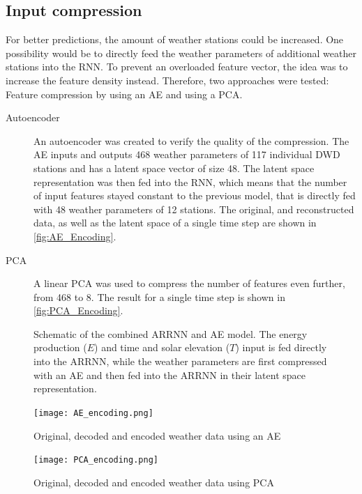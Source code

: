 \documentclass[11pt,table]{article}
\begin{document}
\subsection{Input compression}
For better predictions, the amount of weather stations could be increased. One possibility would be to directly feed the weather parameters of additional weather stations into the \ac{RNN}. To prevent an overloaded feature vector, the idea was to increase the feature density instead. Therefore, two approaches were tested: Feature compression by using an \ac{AE} and using a \ac{PCA}.

\begin{description}
\item[Autoencoder] An autoencoder was created to verify the quality of the compression. The \ac{AE} inputs and outputs 468 weather parameters of 117 individual \ac{DWD} stations and has a latent space vector of size 48. The latent space representation was then fed into the \ac{RNN}, which means that the number of input features stayed constant to the previous model, that is directly fed with 48 weather parameters of 12 stations. The original, and reconstructed data, as well as the latent space of a single time step are shown in \autoref{fig:AE_Encoding}.
\item[PCA] A linear \ac{PCA} was used to compress the number of features even further, from 468 to 8. The result for a single time step is shown in \autoref{fig:PCA_Encoding}.
\end{description}

\begin{figure}[!htb]
    \centering
    
    \caption{Schematic of the combined \ac{ARRNN} and \ac{AE} model. The energy production ($E$) and time and solar elevation ($T$) input is fed directly into the \ac{ARRNN}, while the weather parameters are first compressed with an \ac{AE} and then fed into the \ac{ARRNN} in their latent space representation.}
    \label{fig:rnn_with_ae}
\end{figure}

\begin{figure}[!htb]
	\centering
	\texttt{[image: AE\_encoding.png]}
	\caption{Original, decoded and encoded weather data using an \ac{AE}}
	\label{fig:AE_Encoding}
\end{figure}

\begin{figure}[!htb]
	\centering
	\texttt{[image: PCA\_encoding.png]}
	\caption{Original, decoded and encoded weather data using \ac{PCA}}
	\label{fig:PCA_Encoding}
\end{figure}
\end{document}

